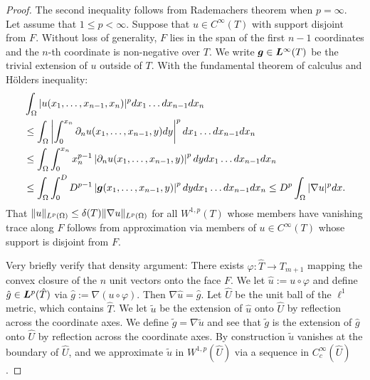 \documentclass[10pt,a4paper]{article}
\begin{document}
\begin{proof}
    The second inequality follows from Rademachers theorem when $p = \infty$.
    Let assume that $1 \leq p < \infty$. 
    Suppose that $u \in C^{\infty}(T)$ with support disjoint from $F$.
    Without loss of generality, $F$ lies in the span of the first $n-1$ coordinates and the $n$-th coordinate is non-negative over $T$. 
    We write $\bm{g} \in \bm{L}^{\infty}(T)$ be the trivial extension of $u$ outside of $T$.
    With the fundamental theorem of calculus and H\"olders inequality: 
    \begin{align*}
        &
        \int_{\Omega} |u(x_{1},\dots,x_{n-1},x_{n})|^{p} dx_1 \dots dx_{n-1} dx_{n}
        \\&
        \leq
        \int_{\Omega} \left| \int_{0}^{x_n} \partial_{n} u(x_{1},\dots,x_{n-1},y) dy \right|^{p} dx_1 \dots dx_{n-1} dx_{n}
        \\&
        \leq
        \int_{\Omega} \int_{0}^{x_n} x_{n}^{p-1} \left| \partial_{n} u(x_{1},\dots,x_{n-1},y) \right|^{p} dy dx_1 \dots dx_{n-1} dx_{n}
        \\&
        \leq
        \int_{\Omega} \int_{0}^{D} D^{p-1} \left| \bm{g}(x_{1},\dots,x_{n-1},y) \right|^{p} dy dx_1 \dots dx_{n-1} dx_{n}
        \leq 
        D^{p} 
        \int_{\Omega} |\nabla u|^{p} dx
        .
    \end{align*}
    That $\|u\|_{L^{p}(\Omega)} \leq {\delta}(T) \|\nabla u\|_{L^{p}(\Omega)}$ for all $W^{1,p}(T)$ whose members have vanishing trace along $F$ follows from approximation via members of $u \in C^{\infty}(T)$ whose support is disjoint from $F$. 
    
    Very briefly verify that density argument: 
    There exists $\varphi : \hat T \rightarrow T_{m+1}$ mapping the convex closure of the $n$ unit vectors onto the face $F$.
    We let $\hat u := u \circ \varphi$ and define $\hat g \in \bm{L}^p(\hat T)$ via $\hat g := \nabla ( u \circ \varphi )$. 
    Then $\nabla \hat u = \hat g$. 
    Let $\hat U$ be the unit ball of the $\ell^1$ metric, which contains $\hat T$.
    We let $\tilde u$ be the extension of $\hat u$ onto $\hat U$ by reflection across the coordinate axes.
    We define $\tilde g = \nabla \tilde u$
    and see that $\tilde g$ is the extension of $\hat g$ onto $\hat U$ by reflection across the coordinate axes. 
    By construction $\tilde u$ vanishes at the boundary of $\hat U$,
    and we approximate $\tilde u$ in $W^{1,p}(\hat U)$ via a sequence in $C^{\infty}_{c}(\hat U)$. 
    

\end{proof}
\end{document}
